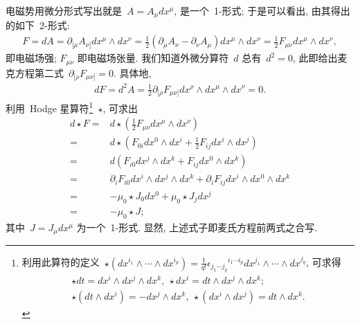电磁势用微分形式写出就是~$A=A_\mu dx^\mu$, 是一个~1-形式; 于是可以看出, 由其得出的如下~2-形式:
\begin{align}
F=dA=\partial_{[\mu}A_{\nu]}dx^\mu\wedge dx^\nu=\frac{1}{2}(\partial_\mu A_\nu-\partial_\nu A_\mu)dx^\mu\wedge dx^\nu=\frac{1}{2}F_{\mu\nu}dx^\mu\wedge dx^\nu,
\end{align}
即电磁场强; $F_{\mu\nu}$ 即电磁场张量. 我们知道外微分算符~$d$ 总有~$d^2=0$, 此即给出麦克方程第二式~$\partial_{[\rho}F_{\mu\nu]}=0$. 具体地,
\begin{gather}
dF=d^2A=\frac{1}{2}\partial_{[\rho}F_{\mu\nu]}dx^\rho\wedge dx^\mu\wedge dx^\nu=0.
\end{gather}
利用~Hodge 星算符\footnote{
利用此算符的定义~$\star(dx^{i_1}\wedge\cdots\wedge dx^{i_p})=\frac{1}{q!}{\epsilon_{j_1\cdots j_q}}^{i_1\cdots i_p}dx^{j_1}\wedge\cdots\wedge dx^{j_q}$, 可求得
\begin{gather}
\star dt=dx^i\wedge dx^j\wedge dx^k,~\star dx^i=dt\wedge dx^j\wedge dx^k;\\
\star (dt\wedge dx^i)=-dx^j\wedge dx^k,~\star(dx^i\wedge dx^j)=dt\wedge dx^k.
\end{gather}
}~$\star$, 可求出
\begin{align}
d\star F=&d\star\left(\frac{1}{2}F_{\mu\nu}dx^\mu\wedge dx^\nu\right)\nonumber\\
=&d\star\left(F_{0i}dx^0\wedge dx^i+\frac{1}{2}F_{ij}dx^i\wedge dx^j\right)\nonumber\\%
=&d\left(F_{i0}dx^j\wedge dx^k+F_{ij}dx^0\wedge dx^k\right)\nonumber\\%
=&\partial_iF_{i0}dx^i\wedge dx^j\wedge dx^k+\partial_iF_{ij}dx^i\wedge dx^0\wedge dx^k\nonumber\\
=&-\mu_0\star J_0dx^0+\mu_0\star J_jdx^j\nonumber\\
=&-\mu_0\star J;
\end{align}
其中~$J=J_\mu dx^\mu$ 为一个~1-形式. 显然, 上述式子即麦氏方程前两式之合写.



